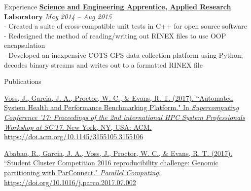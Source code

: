 \documentclass{resume} %
\begin{document}
\begin{rSection}{Experience}
\href{http://arlut.utexas.edu}
{\textbf{Science and Engineering Apprentice, Applied Research Laboratory}
  \hfill{\em May 2014 -- Aug 2015}}
\\- Created a suite of cross-compatible unit tests in C++ for open source software
\\- Redesigned the method of reading/writing out RINEX files to use OOP encapsulation
\\- Developed an inexpensive COTS GPS data collection platform using Python; decodes binary streams and writes out to a formatted RINEX file

\end{rSection}

\begin{rSection}{Publications}

\href{http://doi.acm.org/10.1145/3155105.3155106}
{\underline{Voss, J.}, Garcia, J. A., Proctor, W. C., \& Evans, R. T.
(2017). ``Automated System Health and Performance Benchmarking Platform."
In \textit{Supercomputing Conference '17: Proceedings of the 2nd international
HPC System Professionals Workshop at SC'17}. New York, NY, USA: ACM.
https://doi.acm.org/10.1145/3155105.3155106}

\href{https://doi.org/10.1016/j.parco.2017.07.002}
{Ababao, R., Garcia, J. A., \underline{Voss, J.}, Proctor, W. C., \& Evans, R.
T. (2017). ``Student Cluster \linebreak Competition 2016 reproducibility challenge: Genomic
partitioning with ParConnect." \textit{Parallel Computing.} \linebreak https://doi.org/10.1016/j.parco.2017.07.002}

\end{rSection}


\end{document}
